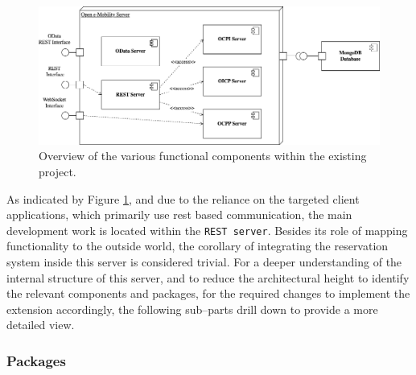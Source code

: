 \begin{figure}[h]
    \centering
    \includegraphics[scale=0.4]{resources/images/main/6_implementation/DeploymentView.png}
    \caption{Overview of the various functional components within the existing project.}
    \label{fig:module-view}
\end{figure}

\noindent As indicated by Figure \ref{fig:module-view}, and due to the reliance on the targeted client applications, which primarily use \acrshort{rest} based communication, the main development work is located within the \texttt{REST server}. 
Besides its role of mapping functionality to the outside world, the corollary of integrating the reservation system inside this server is considered trivial.
For a deeper understanding of the internal structure of this server, and to reduce the architectural height to identify the relevant components and packages, for the required changes to implement the extension accordingly, the following sub--parts drill down to provide a more detailed view.

\subsubsection{Packages}
\label{ch:Implementation:sec:Reservation System:ssec:Architectural Views:sssec:Packages}


